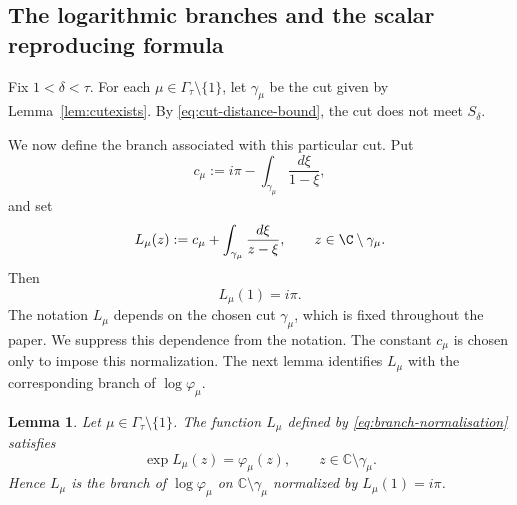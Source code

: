 \documentclass[11pt]{amsart}
\numberwithin{equation}{section}
\newtheorem{lemma}[theorem]{Lemma}
\theoremstyle{definition}
\theoremstyle{plain}
\begin{document}
\subsection{The logarithmic branches and the scalar reproducing  formula}

Fix \(1<\delta<\tau\).  For each
\(\mu\in\Gamma_\tau\setminus\{1\}\), let \(\gamma_\mu\) be the cut given by
Lemma~\ref{lem:cutexists}. 
By \eqref{eq:cut-distance-bound}, 
the cut does not meet \(S_\delta\).

We now define the branch associated with this particular cut.    Put
\begin{equation}\label{eq:c-mu-definition}
        c_\mu
        :=
        i\pi-\int_{\gamma_\mu}\frac{d\xi}{1-\xi},
\end{equation}
and set
\begin{equation}\label{eq:branch-normalisation}
        L_\mu(z)
        :=
        c_\mu+\int_{\gamma_\mu}\frac{d\xi}{z-\xi},
        \qquad z\in\C\setminus\gamma_\mu.
\end{equation}
Then
\[
        L_\mu(1)=i\pi.
\]
The notation \(L_\mu\) depends on the chosen cut \(\gamma_\mu\), which is
fixed throughout the paper. We suppress this dependence from the notation.
 The constant \(c_\mu\) is chosen only to impose
this normalization.  The next lemma identifies \(L_\mu\) with the
corresponding branch of \(\log\varphi_\mu\).


\begin{lemma}\label{lem:cutrepr}
Let \(\mu\in\Gamma_\tau\setminus\{1\}\).  The function \(L_\mu\) defined by
\eqref{eq:branch-normalisation} satisfies
\[
        \exp L_\mu(z)=\varphi_\mu(z),
        \qquad z\in\mathbb C\setminus\gamma_\mu.
\]
Hence \(L_\mu\) is the branch of
\(\log\varphi_\mu\) on \(\mathbb C\setminus\gamma_\mu\) normalized by
\(L_\mu(1)=i\pi\).
\end{lemma}
\end{document}
